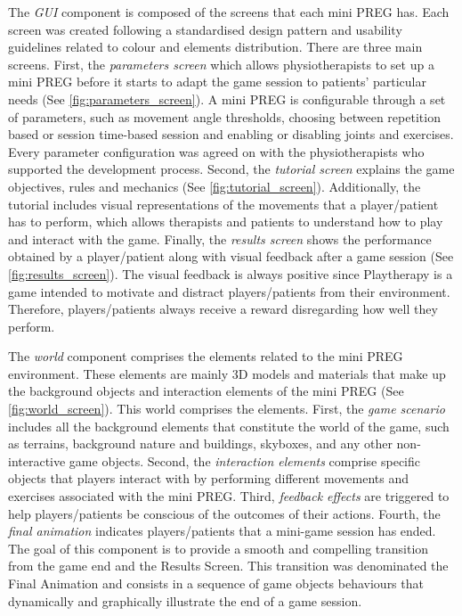 The \emph{GUI} component is composed of the screens that each mini \ac{PREG} has. Each screen was created following a standardised design pattern and usability guidelines related to colour and elements distribution. There are three main screens. First, the \emph{parameters screen} which allows physiotherapists to set up a mini \ac{PREG} before it starts to adapt the game session to patients' particular needs (See \autoref{fig:parameters_screen}). A mini \ac{PREG} is configurable through a set of parameters, such as movement angle thresholds, choosing between repetition based or session time-based session and enabling or disabling joints and exercises. Every parameter configuration was agreed on with the physiotherapists who supported the development process. Second, the \emph{tutorial screen} explains the game objectives, rules and mechanics (See \autoref{fig:tutorial_screen}). Additionally, the tutorial includes visual representations of the movements that a player/patient has to perform, which allows therapists and patients to understand how to play and interact with the game. Finally, the \emph{results screen} shows the performance obtained by a player/patient along with visual feedback after a game session (See \autoref{fig:results_screen}). The visual feedback is always positive since Playtherapy is a game intended to motivate and distract players/patients from their environment. Therefore, players/patients always receive a reward disregarding how well they perform.
    
The \emph{world} component comprises the elements related to the mini \ac{PREG} environment. These elements are mainly 3D models and materials that make up the background objects and interaction elements of the mini \ac{PREG} (See \autoref{fig:world_screen}). This world comprises the elements. First, the \emph{game scenario} includes all the background elements that constitute the world of the game, such as terrains, background nature and buildings, skyboxes, and any other non-interactive game objects. Second, the \emph{interaction elements} comprise specific objects that players interact with by performing different movements and exercises associated with the mini \ac{PREG}. Third, \emph{feedback effects} are triggered to help players/patients be conscious of the outcomes of their actions. Fourth, the \emph{final animation} indicates players/patients that a mini-game session has ended. The goal of this component is to provide a smooth and compelling transition from the game end and the Results Screen. This transition was denominated the Final Animation and consists in a sequence of game objects behaviours that dynamically and graphically illustrate the end of a game session.

